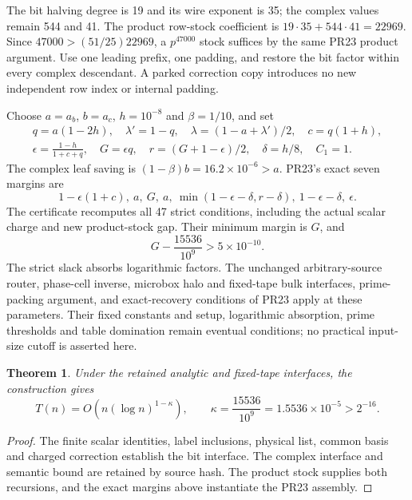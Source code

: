 \documentclass[11pt]{article}
\newtheorem{theorem}{Theorem}
\begin{document}
The bit halving degree is 19 and its wire exponent is 35; the complex
values remain 544 and 41. The product row-stock coefficient is
$19\cdot35+544\cdot41=22969$. Since
$47000>(51/25)22969$, a $p^{47000}$ stock suffices by the same PR23
product argument. Use one leading prefix, one padding, and restore the
bit factor within every complex descendant. A parked correction copy
introduces no new independent row index or internal padding.

Choose $a=a_b$, $b=a_c$, $h=10^{-8}$ and $\beta=1/10$, and set
\[
\begin{gathered}
 q=a(1-2h),\quad\lambda'=1-q,\quad
 \lambda=(1-a+\lambda')/2,\quad c=q(1+h),\\
 \epsilon=\frac{1-h}{1+c+q},\quad G=\epsilon q,\quad
 r=(G+1-\epsilon)/2,\quad\delta=h/8,\quad C_1=1.
\end{gathered}
\]
The complex leaf saving is $(1-\beta)b=16.2\times10^{-6}>a$.
PR23's exact seven margins are
\[
 1-\epsilon(1+c),\ a,\ G,\ a,\
 \min(1-\epsilon-\delta,r-\delta),\ 1-\epsilon-\delta,\ \epsilon.
\]
The certificate recomputes all 47 strict conditions, including the actual
scalar charge and new product-stock gap. Their minimum margin is $G$, and
\[
 G-\frac{15536}{10^9}>5\times10^{-10}.
\]
The strict slack absorbs logarithmic factors. The unchanged arbitrary-source
router, phase-cell inverse, microbox halo and fixed-tape bulk interfaces,
prime-packing argument, and exact-recovery conditions of PR23 apply at
these parameters. Their fixed constants and setup, logarithmic absorption,
prime thresholds and table domination remain eventual conditions; no
practical input-size cutoff is asserted here.

\begin{theorem}
Under the retained analytic and fixed-tape interfaces, the construction gives
\[
 T(n)=O\!\left(n(\log n)^{1-\kappa}\right),\qquad
 \kappa=\frac{15536}{10^9}=1.5536\times10^{-5}>2^{-16}.
\]
\end{theorem}
\begin{proof}
The finite scalar identities, label inclusions, physical list, common basis
and charged correction establish the bit interface. The complex interface
and semantic bound are retained by source hash. The product stock supplies
both recursions, and the exact margins above instantiate the PR23 assembly.
\end{proof}
\end{document}
